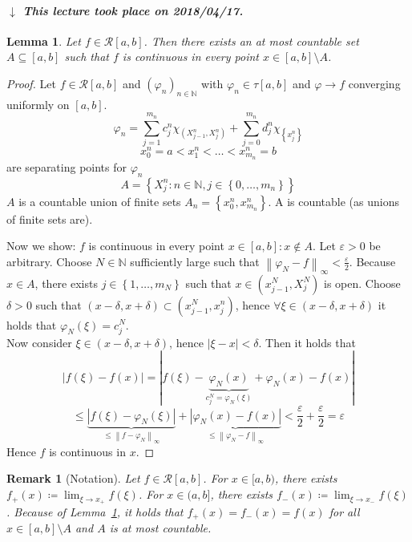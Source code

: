 \documentclass{article}
\newtheorem{lemma}{Lemma}  \numberwithin{lemma}{section}
\newtheorem{remark}{Remark}  \numberwithin{remark}{section}
\newcommand{\set}[1]{\left\{#1\right\}}
\newcommand{\norm}[1]{\left\|#1\right\|}
\newcommand{\card}[1]{\left|#1\right|}
\newcommand{\dateref}[1]{%
  \begin{mdframed}[backgroundcolor=gray!10,innerbottommargin=0pt,innertopmargin=0pt]
    \paragraph{\textit{$\downarrow$ This lecture took place on #1.}}%
  \end{mdframed}%
}
\begin{document}
\dateref{2018/04/17}

\begin{lemma} %
  \label{lemma9}
  Let $f \in \mathcal R[a,b]$. Then there exists an at most countable set $A \subseteq [a,b]$ such that $f$ is continuous in every point $x \in [a,b] \setminus A$.
\end{lemma}
\begin{proof}
  Let $f \in \mathcal R[a,b]$ and $(\varphi_n)_{n \in \mathbb N}$ with $\varphi_n \in \tau[a,b]$ and $\varphi \to f$ converging uniformly on $[a,b]$.
  \[ \varphi_n = \sum_{j=1}^{m_n} c_j^n \chi_{(X_{j-1}^n, X_j^n)} + \sum_{j=0}^{m_n} d_j^n \chi_{\set{x_j^n}} \]
  \[ x_0^n = a < x_1^n < \ldots < x_{m_n}^n = b \]
  are separating points for $\varphi_n$
  \[ A = \set{X_j^n: n \in \mathbb N, j \in \set{0, \ldots, m_n}} \]
  $A$ is a countable union of finite sets $A_n = \set{x_0^n, x_{m_n}^n}$. A is countable (as unions of finite sets are).

  Now we show: $f$ is continuous in every point $x \in [a,b]: x \not\in A$.
  Let $\varepsilon > 0$ be arbitrary. Choose $N \in \mathbb N$ sufficiently large such that $\norm{\varphi_N - f}_{\infty} < \frac\varepsilon2$. Because $x \in A$, there exists $j \in \set{1, \ldots, m_N}$ such that $x \in (x_{j-1}^N, X_j^N)$ is open.
  Choose $\delta > 0$ such that $(x - \delta, x + \delta) \subset (x_{j-1}^N, x_j^n)$, hence $\forall \xi \in (x - \delta, x + \delta)$ it holds that $\varphi_N(\xi) = c_j^N$. \\
  Now consider $\xi \in (x - \delta, x + \delta)$, hence $\card{\xi - x} < \delta$. Then it holds that
  \[ \card{f(\xi) - f(x)} = \card{f(\xi) - \underbrace{\varphi_N(x)}_{c_j^N = \varphi_N(\xi)} + \varphi_N(x) - f(x)} \]
  \[ \leq \underbrace{\card{f(\xi) - \varphi_N(\xi)}}_{\leq \norm{f - \varphi_N}_{\infty}} + \underbrace{\card{\varphi_N(x) - f(x)}}_{\leq \norm{\varphi_N - f}_{\infty}} < \frac\varepsilon2 + \frac\varepsilon2 = \varepsilon \]
  Hence $f$ is continuous in $x$.
\end{proof}

\begin{remark}[Notation]
  Let $f \in \mathcal R[a,b]$. For $x \in [a,b)$, there exists $f_+(x) \coloneqq \lim_{\xi \to x_+} f(\xi)$.
  For $x \in (a,b]$, there exists $f_-(x) \coloneqq \lim_{\xi \to x_-} f(\xi)$.
  Because of Lemma~\ref{lemma9}, it holds that $f_+(x) = f_-(x) = f(x)$ for all $x \in [a,b] \setminus A$ and $A$ is at most countable.
\end{remark}
\end{document}
